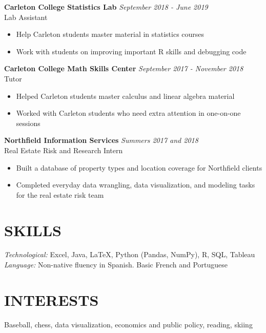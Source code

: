 \documentclass[margin, 10pt]{res} %
\begin{document}
\begin{resume}
{\sl} \textbf{Carleton College Statistics Lab} \hfill \textit{September 2018 - June 2019}\\
{\sl} Lab Assistant \smallskip
{\sl} \begin{itemize}
\item Help Carleton students master material in statistics courses
\item Work with students on improving important R skills and debugging code
\end{itemize}

{\sl} \textbf{Carleton College Math Skills Center} \hfill \textit{September 2017 - November 2018}\\
{\sl} Tutor \smallskip
{\sl} \begin{itemize}
\item Helped Carleton students master calculus and linear algebra material
\item Worked with Carleton students who need extra attention in one-on-one sessions
\end{itemize}

{\sl} \textbf{Northfield Information Services} \hfill \textit{Summers 2017 and 2018}\\
{\sl} Real Estate Risk and Research Intern \smallskip
{\sl} \begin{itemize}
\item Built a database of property types and location coverage for Northfield clients
\item Completed everyday data wrangling, data visualization, and modeling tasks for the real estate risk team
\end{itemize}


\section{SKILLS}
{\sl Technological:} Excel, Java, LaTeX, Python (Pandas, NumPy), R, SQL, Tableau\\ \smallskip
{\sl Language:} Non-native fluency in Spanish. Basic French and Portuguese

\section{INTERESTS}
{\sl} Baseball, chess, data visualization, economics and public policy, reading, skiing

\end{resume}
\end{document}
